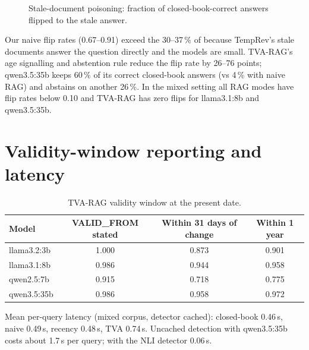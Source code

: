 \documentclass[11pt,a4paper]{report}
\begin{document}
\begin{figure}[htbp]\centering
{}
\caption{Stale-document poisoning: fraction of closed-book-correct answers flipped to the stale answer.}
\end{figure}

Our naive flip rates (0.67--0.91) exceed the 30--37\,\% of \cite{stale} because TempRev's stale documents answer the question directly and the models are small. TVA-RAG's age signalling and abstention rule reduce the flip rate by 26--76 points; qwen3.5:35b keeps 60\,\% of its correct closed-book answers (vs 4\,\% with naive RAG) and abstains on another 26\,\%. In the mixed setting all RAG modes have flip rates below 0.10 and TVA-RAG has zero flips for llama3.1:8b and qwen3.5:35b.

\section{Validity-window reporting and latency}
\begin{table}[htbp]\centering\caption{TVA-RAG validity window at the present date.}\small
\begin{tabular}{l c c c}\toprule\rowcolor{cIngest}\textbf{Model}&\textbf{VALID\_FROM stated}&\textbf{Within 31 days of change}&\textbf{Within 1 year}\\\midrule
llama3.2:3b & 1.000 & 0.873 & 0.901\\ llama3.1:8b & 0.986 & 0.944 & 0.958\\ qwen2.5:7b & 0.915 & 0.718 & 0.775\\ qwen3.5:35b & 0.986 & 0.958 & 0.972\\\bottomrule\end{tabular}\end{table}
Mean per-query latency (mixed corpus, detector cached): closed-book 0.46\,s, naive 0.49\,s, recency 0.48\,s, TVA 0.74\,s. Uncached detection with qwen3.5:35b costs about 1.7\,s per query; with the NLI detector 0.06\,s.
\end{document}
